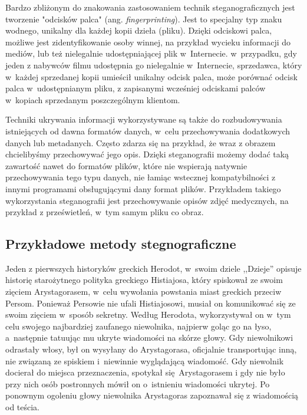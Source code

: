 \documentclass[a4paper, twoside, 12pt]{report}
\begin{document}
        Bardzo zbliżonym do znakowania zastosowaniem technik steganograficznych jest
        tworzenie "odcisków palca" (ang. \emph{fingerprinting}). Jest to specjalny
        typ znaku wodnego, unikalny dla każdej kopii dzieła (pliku). Dzięki odciskowi
        palca, możliwe jest zidentyfikowanie osoby winnej, na przykład wycieku informacji
        do mediów, lub też nielegalnie udostępniającej plik w~Internecie. w~przypadku,
        gdy jeden z nabywców filmu udostępnia go nielegalnie w~Internecie, sprzedawca,
        który w~każdej sprzedanej kopii umieścił unikalny odcisk palca, może porównać
        odcisk palca w~udostępnianym pliku, z zapisanymi wcześniej odciskami palców
        w~kopiach sprzedanym poszczególnym klientom.

        Techniki ukrywania informacji wykorzystywane są także do rozbudowywania
        istniejących od dawna formatów danych, w~celu przechowywania dodatkowych
        danych lub metadanych. Często zdarza się na przykład, że wraz z obrazem
        chcielibyśmy przechowywać jego opis. Dzięki steganografii możemy dodać
        taką zawartość nawet do formatów plików, które nie wspierają natywnie
        przechowywania tego typu danych, nie łamiąc wstecznej kompatybilności z innymi
        programami obsługującymi dany format plików. Przykładem takiego wykorzystania
        steganografii jest przechowywanie opisów zdjęć medycznych, na przykład
        z prześwietleń, w~tym samym pliku co obraz.\cite{DISAPPEARINGCRYPTOEMBEDDINGMETDATA}

        \subsection{Przykładowe metody stegnograficzne}
        Jeden z pierwszych historyków greckich Herodot, w~swoim dziele ,,Dzieje''
        opisuje historię starożytnego polityka greckiego Histiajosa, który spiskował
        ze swoim zięciem Arystagorasem, w~celu wywołania powstania miast greckich
        przeciw Persom\cite{STEGANOGRAPHYINTRO}. Ponieważ Persowie nie ufali Histiajosowi, musiał on komunikować
        się ze swoim zięciem w~sposób sekretny. Według Herodota, wykorzystywał
        on w~tym celu swojego najbardziej zaufanego niewolnika, najpierw goląc
        go na łyso, a~następnie tatuując mu ukryte wiadomości na skórze głowy.
        Gdy niewolnikowi odrastały włosy, był on wysyłany do Arystagorasa, oficjalnie
        transportując inną, nie związaną ze spiskiem i~niewinnie wyglądającą wiadomość.
        Gdy niewolnik docierał do miejsca przeznaczenia, spotykał się Arystagorasem i
        gdy nie było przy nich osób postronnych mówił on o~istnieniu wiadomości ukrytej.
        Po ponownym ogoleniu głowy niewolnika Arystagoras zapoznawał się z wiadomością
        od teścia.
\end{document}
